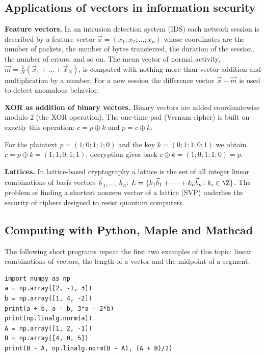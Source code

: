 \subsection{Applications of vectors in information security}

\textbf{Feature vectors.}
In an intrusion detection system (IDS) each network session is described
by a feature vector $\vec x=(x_1;x_2;\dots;x_n)$ whose coordinates are the
number of packets, the number of bytes transferred, the duration of the
session, the number of errors, and so on. The mean vector of normal
activity, $\vec m=\frac1N(\vec x_1+\dots+\vec x_N)$, is computed with
nothing more than vector addition and multiplication by a number. For a new
session the difference vector $\vec x-\vec m$ is used to detect anomalous
behavior.

\textbf{XOR as addition of binary vectors.}
Binary vectors are added coordinatewise modulo 2 (the XOR operation). The
one-time pad (Vernam cipher) is built on exactly this operation:
$c=p\oplus k$ and $p=c\oplus k$.

\begin{misol}
For the plaintext $p=(1;0;1;1;0)$ and the key $k=(0;1;1;0;1)$ we obtain
$c=p\oplus k=(1;1;0;1;1)$; decryption gives back
$c\oplus k=(1;0;1;1;0)=p$.
\end{misol}

\textbf{Lattices.} In lattice-based cryptography a lattice is the set of all
integer linear combinations of basis vectors $\vec b_1,\dots,\vec b_n$:
$L=\{k_1\vec b_1+\dots+k_n\vec b_n\colon k_i\in\Z\}$. The problem of finding
a shortest nonzero vector of a lattice (SVP) underlies the security of
ciphers designed to resist quantum computers.

\subsection{Computing with Python, Maple and Mathcad}

The following short programs repeat the first two examples of this topic:
linear combinations of vectors, the length of a vector and the midpoint of
a segment.

\begin{Verbatim}[fontsize=\footnotesize,frame=single,label={\small Python}]
import numpy as np
a = np.array([2, -1, 3])
b = np.array([1, 4, -2])
print(a + b, a - b, 3*a - 2*b)
print(np.linalg.norm(a))
A = np.array([1, 2, -1])
B = np.array([4, 0, 5])
print(B - A, np.linalg.norm(B - A), (A + B)/2)
\end{Verbatim}

